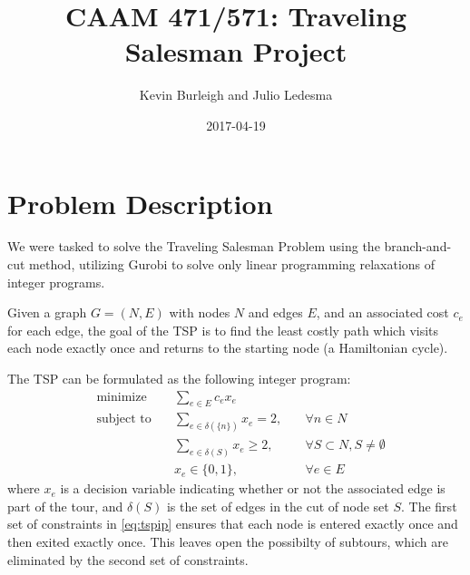 \documentclass{article}
\title{CAAM 471/571: Traveling Salesman Project}
\date{2017-04-19}
\author{Kevin Burleigh and Julio Ledesma}
\begin{document}
\maketitle


\section{Problem Description}
\begin{flushleft}

We were tasked
to solve the Traveling Salesman Problem
using the branch-and-cut method,
utilizing Gurobi
to solve only linear programming relaxations of integer programs.

Given a graph $G = (N,E)$ with nodes $N$ and edges $E$,
and an associated cost $c_e$ for each edge,
the goal of the TSP
is to find the least costly path
which visits each node exactly once
and returns to the starting node
(a Hamiltonian cycle).

The TSP can be formulated
as the following integer program:
\begin{equation} \label{eq:tspip}
\begin{alignedat}{3}
 & \text{minimize}         & \sum_{e \in E}{c_e x_e} & \\
 & \text{subject to} \quad & \sum_{e \in \delta(\{n\})}{x_e} = 2, \quad & \forall n \in N \\
 &                   \quad & \sum_{e \in \delta(S)}{x_e} \geq 2,  \quad & \forall S \subset N, S \neq \emptyset \\
 &                         & x_e \in \{ 0,1 \}, \quad                     & \forall e \in E
\end{alignedat}
\end{equation}
where $x_e$ is a decision variable
indicating whether or not
the associated edge is part of the tour,
and $\delta(S)$ is the set of edges
in the cut of node set $S$.
The first set of constraints in \eqref{eq:tspip}
ensures that each node
is entered exactly once
and then exited exactly once.
This leaves open the possibilty of subtours,
which are eliminated by the second set of constraints.


\end{flushleft}
\end{document}

